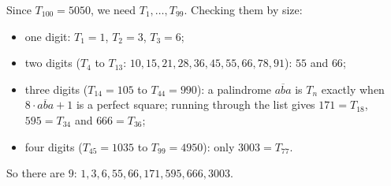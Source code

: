 Since $T_{100}=5050$, we need $T_1,\dots,T_{99}$. Checking them by size:
\begin{itemize}
\item one digit: $T_1=1$, $T_2=3$, $T_3=6$;
\item two digits ($T_4$ to $T_{13}$: $10,15,21,28,36,45,55,66,78,91$): $55$ and $66$;
\item three digits ($T_{14}=105$ to $T_{44}=990$): a palindrome $\overline{aba}$ is $T_n$ exactly when $8\cdot\overline{aba}+1$ is a perfect square; running through the list gives $171=T_{18}$, $595=T_{34}$ and $666=T_{36}$;
\item four digits ($T_{45}=1035$ to $T_{99}=4950$): only $3003=T_{77}$.
\end{itemize}
So there are $\boxed{9}$: $1,3,6,55,66,171,595,666,3003$.
